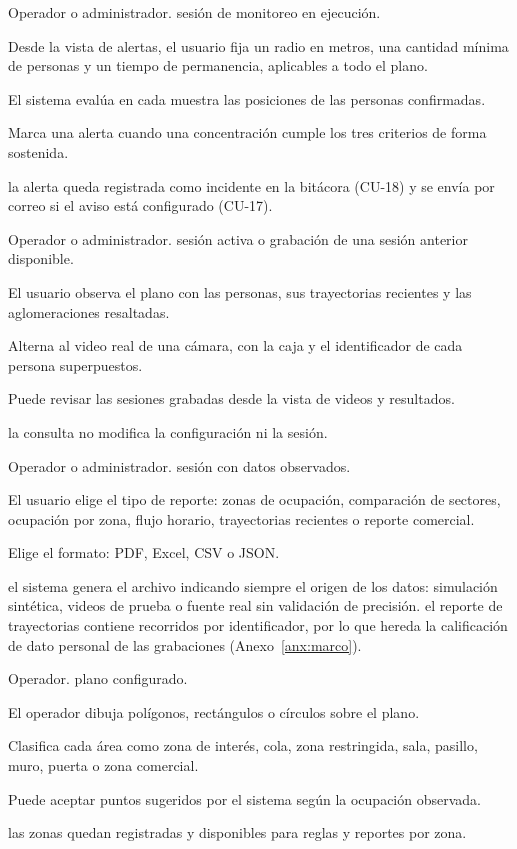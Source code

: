  {Operador o administrador.}
  {sesión de monitoreo en ejecución.}
  {\item Desde la vista de alertas, el usuario fija un radio en metros, una cantidad mínima de
         personas y un tiempo de permanencia, aplicables a todo el plano.
   \item El sistema evalúa en cada muestra las posiciones de las personas confirmadas.
   \item Marca una alerta cuando una concentración cumple los tres criterios de forma
         sostenida.}
  {la alerta queda registrada como incidente en la bitácora (CU-18) y se envía por correo si el
   aviso está configurado (CU-17).}
  {}

  {Operador o administrador.}
  {sesión activa o grabación de una sesión anterior disponible.}
  {\item El usuario observa el plano con las personas, sus trayectorias recientes y las
         aglomeraciones resaltadas.
   \item Alterna al video real de una cámara, con la caja y el identificador de cada persona
         superpuestos.
   \item Puede revisar las sesiones grabadas desde la vista de videos y resultados.}
  {la consulta no modifica la configuración ni la sesión.}
  {}

  {Operador o administrador.}
  {sesión con datos observados.}
  {\item El usuario elige el tipo de reporte: zonas de ocupación, comparación de sectores,
         ocupación por zona, flujo horario, trayectorias recientes o reporte comercial.
   \item Elige el formato: PDF, Excel, CSV o JSON.}
  {el sistema genera el archivo indicando siempre el origen de los datos: simulación sintética,
   videos de prueba o fuente real sin validación de precisión.}
  {el reporte de trayectorias contiene recorridos por identificador, por lo que hereda la
   calificación de dato personal de las grabaciones (Anexo~\ref{anx:marco}).}

  {Operador.}
  {plano configurado.}
  {\item El operador dibuja polígonos, rectángulos o círculos sobre el plano.
   \item Clasifica cada área como zona de interés, cola, zona restringida, sala, pasillo, muro,
         puerta o zona comercial.
   \item Puede aceptar puntos sugeridos por el sistema según la ocupación observada.}
  {las zonas quedan registradas y disponibles para reglas y reportes por zona.}
  {}

